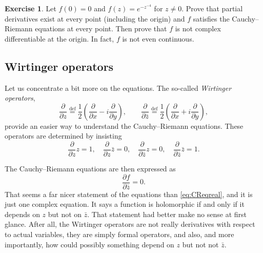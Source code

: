 \documentclass[12pt,openany]{book}
\newcommand{\myindex}[1]{#1\index{#1}}
\theoremstyle{plain}
\theoremstyle{remark}
\theoremstyle{definition}
\newenvironment{exbox}{%
    \def\FrameCommand{\vrule width 1pt \relax\hspace {10pt}}%
    \MakeFramed {\advance \hsize -\width \FrameRestore }%
}{%
    \endMakeFramed
}
\theoremstyle{exercise}
\newtheorem{exercise}{Exercise}[section]
\theoremstyle{example}
\begin{document}
\begin{exbox}
\begin{exercise}
Let $f(0) = 0$ and $f(z) = e^{-z^{-4}}$ for $z \not=0$.  Prove that partial
derivatives exist at every point (including the origin) and $f$
satisfies the Cauchy--Riemann equations at every point.
Then prove
that $f$ is not complex differentiable at the origin.  In fact, $f$ is not
even continuous.
\end{exercise}
\end{exbox}


\subsection{Wirtinger operators}

Let us concentrate a bit more on the equations.
The so-called \emph{\myindex{Wirtinger operators}},
\begin{equation*}
\frac{\partial}{\partial z}
\overset{\text{def}}{=}
\frac{1}{2}
\left(
\frac{\partial}{\partial x} - i
\frac{\partial}{\partial y}
\right),
\qquad
\frac{\partial}{\partial \bar{z}}
\overset{\text{def}}{=}
\frac{1}{2}
\left(
\frac{\partial}{\partial x} + i
\frac{\partial}{\partial y}
\right)
,
\end{equation*}
provide an easier way to understand the
Cauchy--Riemann equations.
These operators are determined by insisting
%
\begin{equation*}
\frac{\partial}{\partial z} z = 1, \quad
\frac{\partial}{\partial z} \bar{z} = 0, \quad
\frac{\partial}{\partial \bar{z}} z = 0, \quad
\frac{\partial}{\partial \bar{z}} \bar{z} = 1.
\end{equation*}

The Cauchy--Riemann equations are then expressed as
\begin{equation} \label{eq:CReq}
\frac{\partial f}{\partial \bar{z}} = 0 .
\end{equation}
That seems a far nicer statement of the equations than \eqref{eq:CReqreal},
and it is just one complex equation.  It says
a function is holomorphic if and only if it depends on $z$ but not on
$\bar{z}$.  That statement had better make no sense at first glance.
After all, the Wirtinger operators are not really derivatives with
respect to actual variables,
they are simply formal operators, and also, and more importantly,
how could possibly something depend on $z$ but not not $\bar{z}$.
\end{document}
